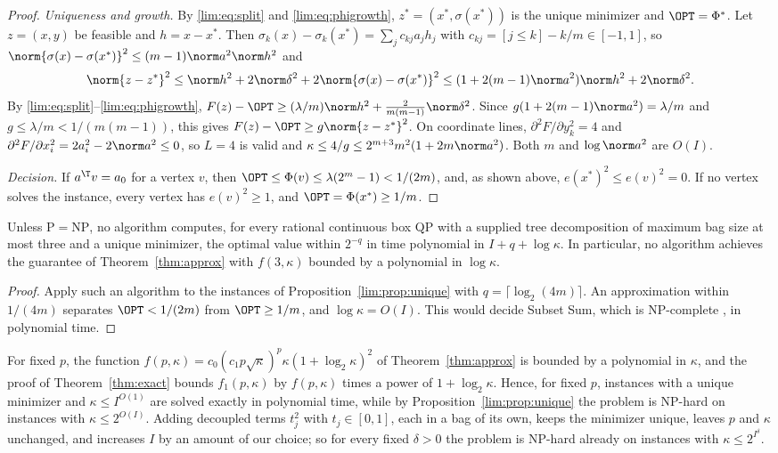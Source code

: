\begin{proof}
\emph{Uniqueness and growth.} By \eqref{lim:eq:split} and
\eqref{lim:eq:phigrowth}, $z^*=(x^*,\sigma(x^*))$ is the unique minimizer
and $\OPT=\Phi^*$. Let $z=(x,y)$ be feasible and $h=x-x^*$. Then
$\sigma_k(x)-\sigma_k(x^*)=\sum_jc_{kj}a_jh_j$ with
$c_{kj}=[j\le k]-k/m\in[-1,1]$, so
$\norm{\sigma(x)-\sigma(x^*)}^2\le(m-1)\norm a^2\norm h^2$ and
\[
\norm{z-z^*}^2\le\norm h^2+2\norm\delta^2+2\norm{\sigma(x)-\sigma(x^*)}^2
\le(1+2(m-1)\norm a^2)\norm h^2+2\norm\delta^2 .
\]
By \eqref{lim:eq:split}--\eqref{lim:eq:phigrowth},
$F(z)-\OPT\ge(\lambda/m)\norm h^2+\frac2{m(m-1)}\norm\delta^2$. Since
$g(1+2(m-1)\norm a^2)=\lambda/m$ and $g\le\lambda/m<1/(m(m-1))$, this gives
$F(z)-\OPT\ge g\norm{z-z^*}^2$. On coordinate lines,
$\partial^2F/\partial y_k^2=4$ and
$\partial^2F/\partial x_i^2=2a_i^2-2\norm a^2\le0$, so $L=4$ is valid and
$\kappa\le4/g\le2^{m+3}m^2(1+2m\norm a^2)$. Both $m$ and $\log\norm a^2$ are
$O(I)$.

\emph{Decision.} If $a^{\T}v=a_0$ for a vertex $v$, then
$\OPT\le\Phi(v)\le\lambda(2^m-1)<1/(2m)$, and, as shown above,
$e(x^*)^2\le e(v)^2=0$. If no vertex solves the instance, every vertex has
$e(v)^2\ge1$, and $\OPT=\Phi(x^*)\ge1/m$.
\end{proof}

\begin{corollary}
\label{lim:cor:nopolylog}
Unless $\mathrm P=\mathrm{NP}$, no algorithm computes, for every rational
continuous box QP with a supplied tree decomposition of maximum bag size at
most three and a unique minimizer, the optimal value within $2^{-q}$ in time
polynomial in $I+q+\log\kappa$. In particular, no algorithm achieves the
guarantee of Theorem~\ref{thm:approx} with $f(3,\kappa)$ bounded by a
polynomial in $\log\kappa$.
\end{corollary}

\begin{proof}
Apply such an algorithm to the instances of
Proposition~\ref{lim:prop:unique} with $q=\lceil\log_2(4m)\rceil$. An
approximation within $1/(4m)$ separates $\OPT<1/(2m)$ from $\OPT\ge1/m$,
and $\log\kappa=O(I)$. This would decide Subset Sum, which is NP-complete
\cite{GareyJohnson1979}, in polynomial time.
\end{proof}

For fixed $p$, the function
$f(p,\kappa)=c_0(c_1p\sqrt\kappa)^p\kappa(1+\log_2\kappa)^2$ of
Theorem~\ref{thm:approx} is bounded by a polynomial in $\kappa$, and the proof
of Theorem~\ref{thm:exact} bounds $f_1(p,\kappa)$ by $f(p,\kappa)$ times a
power of $1+\log_2\kappa$. Hence, for fixed $p$, instances with a unique
minimizer and $\kappa\le I^{O(1)}$ are solved exactly in polynomial time,
while by Proposition~\ref{lim:prop:unique} the problem is NP-hard on
instances with $\kappa\le2^{O(I)}$. Adding decoupled terms $t_j^2$ with
$t_j\in[0,1]$, each in a bag of its own, keeps the minimizer unique, leaves
$p$ and $\kappa$ unchanged, and increases $I$ by an amount of our choice; so
for every fixed $\delta>0$ the problem is NP-hard already on instances with
$\kappa\le2^{I^\delta}$.

